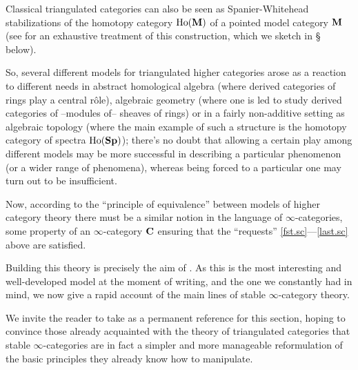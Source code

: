Classical triangulated categories can also be seen as Spanier\hyp{}Whitehead stabilizations of the homotopy category $\text{Ho}(\mathbf{M})$ of a pointed model category $\mathbf{M}$ (see \cite{DeA} for an exhaustive treatment of this construction, which we sketch in \S{} below).

So, several different models for triangulated higher categories arose as a reaction to different needs in abstract homological algebra (where derived categories of rings play a central r\^ole), algebraic geometry (where one is led to study derived categories of --modules of-- sheaves of rings) or in a fairly non\hyp{}additive setting as algebraic topology (where the main example of such a structure is the homotopy category of spectra $\text{Ho}(\mathbf{Sp})$); there's no doubt that allowing a certain play among different models may be more successful in describing a particular phenomenon (or a wider range of phenomena), whereas being forced to a particular one may turn out to be insufficient.

Now, according to the ``principle of equivalence'' between models of higher category theory there must be a similar notion in the language of $\infty$\hyp{}categories, \ie some property of an $\infty$\hyp{}category $\mathbf{C}$ ensuring that the ``requests'' \ref{fst.sc}---\ref{last.sc} above are satisfied.

Building this theory is precisely the aim of \cite[Ch. \textbf{1.1}]{LurieHA}. As this is the most interesting and well\hyp{}developed model at the moment of writing, and the one we constantly had in mind, we now give a rapid account of the main lines of stable $\infty$\hyp{}category theory.

We invite the reader to take \cite{LurieHA} as a permanent reference for this section, hoping to convince those already acquainted with the theory of triangulated categories that stable $\infty$\hyp{}categories are in fact a simpler and more manageable reformulation of the basic principles they already know how to manipulate.
